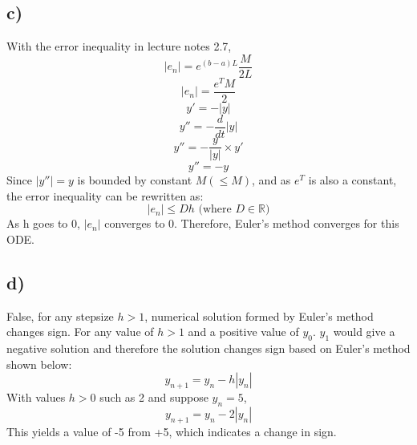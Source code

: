 \documentclass{article}
\begin{document}
\subsection*{c)}
With the error inequality in lecture notes 2.7,
\begin{equation*}
    |e_n|=e^{(b-a)L}\frac{M}{2L}
\end{equation*}
\begin{equation*}
    |e_n|=\frac{e^TM}{2}
\end{equation*}
\begin{equation*}
    y'=-|y|
\end{equation*}
\begin{equation*}
    y''=-\frac{d}{dt}|y|
\end{equation*}
\begin{equation*}
    y''=-\frac{y}{|y|} \times y'
\end{equation*}
\begin{equation*}
    y''=-y
\end{equation*}
Since $|y''|=y$ is bounded by constant $M (\leq M)$, and as $e^T$ is also a constant, the error inequality can be rewritten as:
\begin{equation*}
    |e_n|\leq Dh \text{ (where } D \in \mathbb{R})
\end{equation*}
As h goes to 0, $|e_n|$ converges to 0. Therefore, Euler's method converges for this ODE.

\subsection*{d)}
False, for any stepsize $h>1$, numerical solution formed by Euler's method changes sign. For any value of $h>1$ and a positive value of $y_0$. $y_1$ would give a negative solution and therefore the solution changes sign based on Euler's method shown below:
\begin{equation*}
    y_{n+1}=y_n-h|y_n|
\end{equation*}
With values $h>0$ such as 2 and suppose $y_n=5$, 
\begin{equation*}
    y_{n+1}=y_n-2|y_n|
\end{equation*}
This yields a value of -5 from +5, which indicates a change in sign. 

\subsection{}
\end{document}
